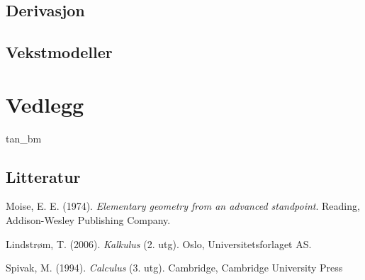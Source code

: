 	\section{Derivasjon}
	\section{Vekstmodeller}
	
	\chapter*{Vedlegg}
	{tan_bm}
	

	
	\newpage
	\section*{Litteratur}
	Moise, E. E. (1974). \textit{Elementary geometry from an advanced standpoint}. Reading, Addison-Wesley Publishing Company.\vsk
	
	Lindstrøm, T. (2006). \textit{Kalkulus} (2. utg). Oslo, Universitetsforlaget AS.\vsk
	
	Spivak, M. (1994). \textit{Calculus} (3. utg). Cambridge, Cambridge University Press
	
	


